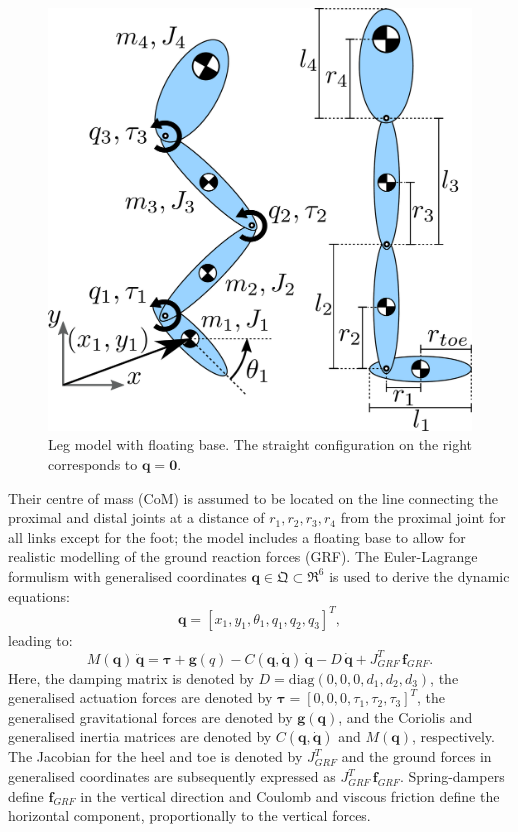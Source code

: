 \documentclass[letterpaper, 10 pt, conference]{ieeeconf}  %
\begin{document}
\begin{figure}[ht]
	\centering
	\includegraphics[width=0.6\linewidth]{Leg_3DoF_model}
	\caption{Leg model with floating base. The straight configuration on
		the right corresponds to $\mathbf{q} = \mathbf{0}$.}
	\label{fig:Leg_3DoF_model}
\end{figure}

Their centre of mass (CoM) is assumed to be located on the line connecting the proximal and distal joints at a distance of $r_1,r_2,r_3,r_4$ from the proximal joint for all links except for the foot; the model includes a floating base to allow for realistic modelling of the ground reaction forces (GRF). %
The Euler-Lagrange formulism with generalised coordinates $\mathbf{q} \in \mathfrak{Q} \subset \mathfrak{R}^{6}$ is used to derive the dynamic equations:
\begin{equation}
	\mathbf{q} = [x_1,y_1,\theta_1,q_1,q_2,q_3]^T,
	\label{eq:q}
\end{equation}
leading to:
\begin{equation}
	M(\mathbf{q}) \, \mathbf{\ddot q} = \mathbf{\boldsymbol{\tau}} + \mathbf{g}(q) - C(\mathbf{q, \dot q}) \, \mathbf{\dot q} - D \, \mathbf{\dot q} + J_{GRF}^T \, \mathbf{f}_{GRF}.
\label{eq:fwddyn}
\end{equation}
Here, the damping matrix is denoted by $D = \mathrm{diag} (0,0,0,d_1,d_2,d_3)$, the generalised actuation forces are denoted by $\boldsymbol{\tau} = [0,0,0,\tau_1,\tau_2,\tau_3]^T$, the generalised gravitational forces are denoted by $\mathbf{g(q)}$, and the Coriolis and generalised inertia matrices are denoted by $C\mathbf{(q, \dot q)}$ and $M(\mathbf{q})$, respectively. The Jacobian for the heel and toe is denoted by $J_{GRF}^T$ and the ground forces in generalised coordinates are subsequently expressed as $J_{GRF}^T \, \mathbf{f}_{GRF}$. Spring-dampers define $\mathbf{f}_{GRF}$ in the vertical direction and Coulomb and viscous friction define the horizontal component, proportionally to the vertical forces.
\end{document}
